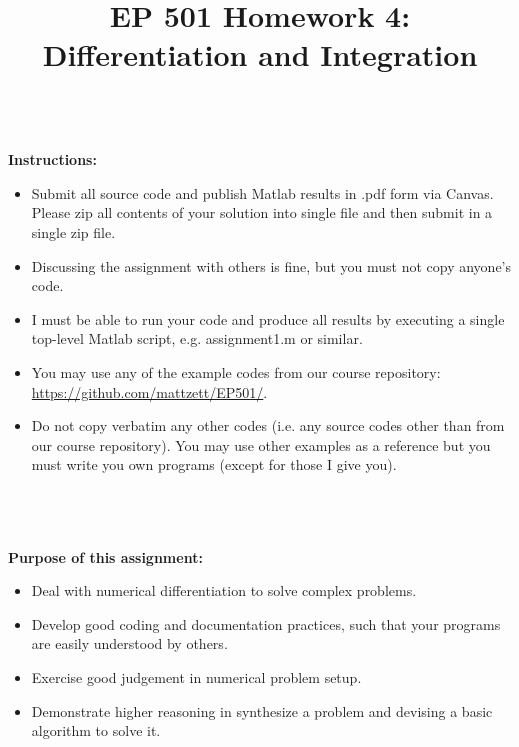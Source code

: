 \documentclass{article}
\begin{document}
\title{EP 501 Homework 4:  Differentiation and Integration}

\maketitle

~\\
\textbf{Instructions:}  
\begin{itemize}
  \item Submit all source code and publish Matlab results in .pdf form via Canvas.  Please zip all contents of your solution into single file and then submit in a single zip file.    
  \item Discussing the assignment with others is fine, but you must not copy anyone's code.  
  \item I must be able to run your code and produce all results by executing a single top-level Matlab script, e.g. \textsf{assignment1.m} or similar.  
  \item You may use any of the example codes from our course repository:  \url{https://github.com/mattzett/EP501/}.
  \item Do not copy verbatim any other codes (i.e. any source codes other than from our course repository).  You may use other examples as a reference but you must write you own programs (except for those I give you).  

\end{itemize}
~\\~\\~\\
\textbf{Purpose of this assignment:}  
\begin{itemize}
  \item Deal with numerical differentiation to solve complex problems.  
  \item Develop good coding and documentation practices, such that your programs are easily understood by others.  
  \item Exercise good judgement in numerical problem setup.
  \item Demonstrate higher reasoning in synthesize a problem and devising a basic algorithm to solve it.  
\end{itemize}

\pagebreak
\end{document}
